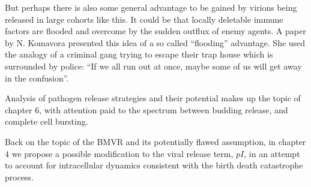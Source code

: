 But perhaps there is also some general advantage to be gained by virions being released in large cohorts like this. It could be that locally deletable immune factors are flooded and overcome by the sudden outflux of enemy agents. A paper by N. Komavora \cite{komarova2007viral} presented this idea of a so called ``flooding'' advantage. She used the analogy of a criminal gang trying to escape their trap house which is surrounded by police: ``If we all run out at once, maybe some of us will get away in the confusion''.\par 

Analysis of pathogen release strategies and their potential makes up the topic of chapter 6, with attention paid to the spectrum between budding release, and complete cell bursting.\par

Back on the topic of the BMVR and its potentially flawed assumption, in chapter 4 we propose a possible modification to the viral release term, $pI$, in an attempt to account for intracellular dynamics consistent with the birth death catastrophe process.

